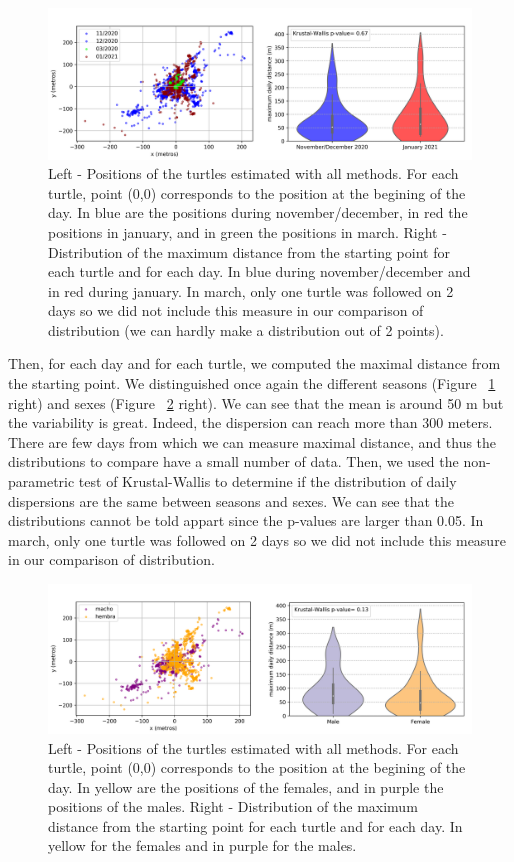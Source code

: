 \documentclass[10pt]{article}
\begin{document}
\begin{figure}[!ht]
\centering
\includegraphics[width=0.9\columnwidth]{all_turtles_temporada.png}
\caption{Left - Positions of the turtles estimated with all methods. For each turtle, point (0,0) corresponds to the position at the begining of the day. In blue are the positions during november/december, in red the positions in january, and in green the positions in march. Right - Distribution of the maximum distance from the starting point for each turtle and for each day. In blue during november/december and in red during january. In march, only one turtle was followed on 2 days so we did not include this measure in our comparison of distribution (we can hardly make a distribution out of 2 points).}
\label{fig:temporada}
\end{figure}

Then, for each day and for each turtle, we computed the maximal distance from the starting point. We distinguished once again the different seasons (Figure ~\ref{fig:temporada} right) and sexes (Figure ~\ref{fig:sexo} right). We can see that the mean is around 50 m but the variability is great. Indeed, the dispersion can reach more than 300 meters. There are few days from which we can measure maximal distance, and thus the distributions to compare have a small number of data. Then, we used the non-parametric test of Krustal-Wallis to determine if the distribution of daily dispersions are the same between seasons and sexes. We can see that the distributions cannot be told appart since the p-values are larger than 0.05. In march, only one turtle was followed on 2 days so we did not include this measure in our comparison of distribution.


\begin{figure}[!ht]
\centering
\includegraphics[width=0.9\columnwidth]{all_turtles_sexo.png}
\caption{Left - Positions of the turtles estimated with all methods. For each turtle, point (0,0) corresponds to the position at the begining of the day. In yellow are the positions of the females, and in purple the positions of the males. Right - Distribution of the maximum distance from the starting point for each turtle and for each day. In yellow for the females and in purple for the males.}
\label{fig:sexo}
\end{figure}
\end{document}
